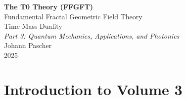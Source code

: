 
	
	\setcounter{section}{0}
	\setcounter{subsection}{0}
	\setcounter{subsubsection}{0}
	\setcounter{paragraph}{0}
	
	\setcounter{secnumdepth}{1}  %
	\makeatletter
	\renewcommand*\l@part[2]{%
		\ifnum \c@tocdepth >-2\relax
		\addpenalty{-\@highpenalty}%
		\addvspace{0.8em \@plus\p@}%
		{\leftskip 0em \relax
			\rightskip \@tocrmarg
			\parfillskip -\rightskip
			\parindent 0em \relax\@afterindenttrue
			\interlinepenalty\@M
			\leavevmode
			{\footnotesize\bfseries #1}\nobreak
			\leaders\hbox{$\m@th\mkern \@dotsep mu\hbox{}\mkern \@dotsep mu$}\hfill
			\nobreak\hb@xt@\@pnumwidth{\hss #2}\par}%
		\addvspace{0.2em \@plus\p@}%
		\nobreak
		\fi}
	\makeatother
	
	\renewcommand{\cftchapfont}{\footnotesize\bfseries}
	\renewcommand{\cftchappagefont}{\footnotesize\bfseries}
	\setlength{\cftbeforechapskip}{0.3em}
	
	\setcounter{tocdepth}{0}
	\begin{titlepage}
		\centering
		\vspace*{2cm}
		
		{\Huge\bfseries The T0 Theory (FFGFT)}\\[0.8cm]
		{\LARGE Fundamental Fractal Geometric Field Theory}\\[0.5cm]
		{\LARGE Time-Mass Duality}\\[1.5cm]
		
		{\Large\itshape Part 3: Quantum Mechanics, Applications, and Photonics}\\[2cm]
		
		{\large Johann Pascher}\\[1cm]
		
		{\large 2025}
		
		\vfill
	\end{titlepage}
	
	\frontmatter
	\pagestyle{fancy}
	\makeatletter
	\let\ps@plain\ps@fancy
	\let\ps@empty\ps@fancy
	\makeatother
	
	\mainmatter
	\pagestyle{fancy}
	
	\tableofcontents
	
	\chapter{Introduction to Volume 3}
	
	
